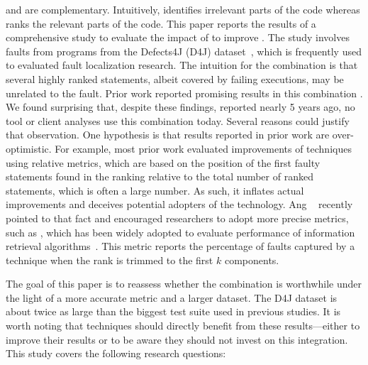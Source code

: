 \documentclass[sigplan,10pt,review,anonymous]{acmart}\settopmatter{printfolios=true,printccs=false,printacmref=false}
\begin{document}

\ds{} and \sfl{} are complementary. Intuitively, \ds{} identifies
irrelevant parts of the code whereas \sfl{} ranks the relevant parts
of the code.  This paper reports the results of a comprehensive study
to evaluate the impact of \ds{} to improve \sfl{}. The study involves
\numFaults{} faults from \numPrograms{} programs from the Defects4J (D4J)
dataset~\cite{just-defects4j-issta2014}, which is frequently used to
evaluated fault localization research. The intuition for the \comb{}
combination is that several highly ranked statements, albeit covered
by failing executions, may be unrelated to the fault. Prior work
reported promising results in this combination
\cite{Wotawa:2010:FLB:1848650.1849235,Alves:2011:FUD:2190078.2190115,DBLP:conf/ecai/HoferW12,lei-mao-dai-wang-2012,slicing-sfl-repair}.
We found surprising that, despite these findings, reported nearly 5
years ago, no tool or client analyses use this combination
today. Several reasons could justify that observation. One hypothesis is that results reported in prior work are
over-optimistic. For example, most prior work evaluated improvements
of \sfl{} techniques using relative metrics, which are based on the
position of the first faulty statements found in the ranking relative
to the total number of ranked statements, which is often a large
number. As such, it inflates actual improvements and deceives
potential adopters of the technology. Ang \etal~\cite{ang-perez-van-deursen-rui-2017} recently
pointed to that fact and encouraged researchers to adopt more precise metrics,
such as \topk{}
\cite{Wu:2014:CLC:2610384.2610386,Lucia:2014:FFL:2642937.2642983,Wen:2016:LLB:2970276.2970359},
which has been widely adopted to evaluate performance of information retrieval algorithms~. This
metric reports the percentage of faults captured by a technique when
the rank is trimmed to the first $k$ components.

The goal of this paper is to reassess whether the \comb{} combination
is worthwhile under the light of a more accurate metric and a larger
dataset. The D4J dataset is about twice as large than the biggest test
suite used in previous studies. It is worth noting that \acrAbrev{}
techniques should directly benefit from these results---either to
improve their results or to be aware they should not invest on this
integration. This study covers the following research questions:
\end{document}
